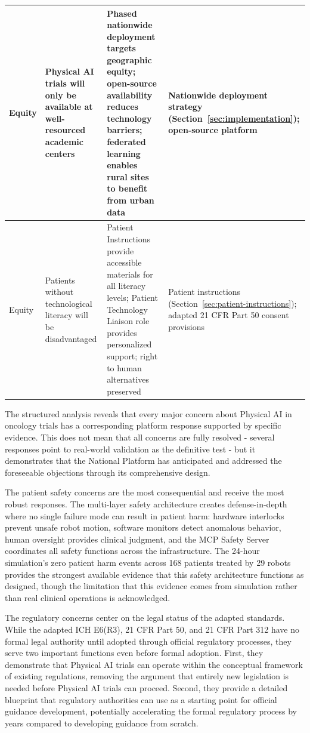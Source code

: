\begin{longtable}{p{2.2cm} p{3.5cm} p{3.0cm} p{3.0cm}}
Equity & Physical AI trials will only be available at well-resourced academic centers & Phased nationwide deployment targets geographic equity; open-source availability reduces technology barriers; federated learning enables rural sites to benefit from urban data & Nationwide deployment strategy (Section~\ref{sec:implementation}); open-source platform \cite{main-repo, mcp-repo, fl-repo} \\
\midrule
Equity & Patients without technological literacy will be disadvantaged & Patient Instructions \cite{patient-instructions-paper} provide accessible materials for all literacy levels; Patient Technology Liaison role provides personalized support; right to human alternatives preserved & Patient instructions (Section~\ref{sec:patient-instructions}); adapted 21 CFR Part 50 \cite{cfr50-adapt} consent provisions \\
\end{longtable}

The structured analysis reveals that every major concern about Physical AI in
oncology trials has a corresponding platform response supported by specific
evidence. This does not mean that all concerns are fully resolved - several
responses point to real-world validation as the definitive test - but it
demonstrates that the National Platform has anticipated and addressed the
foreseeable objections through its comprehensive design.

The patient safety concerns are the most consequential and receive the most
robust responses. The multi-layer safety architecture creates defense-in-depth
where no single failure mode can result in patient harm: hardware interlocks
prevent unsafe robot motion, software monitors detect anomalous behavior,
human oversight provides clinical judgment, and the MCP Safety Server
coordinates all safety functions across the infrastructure. The 24-hour
simulation's zero patient harm events across 168 patients treated by 29 robots
provides the strongest available evidence that this safety architecture
functions as designed, though the limitation that this evidence comes from
simulation rather than real clinical operations is acknowledged.

The regulatory concerns center on the legal status of the adapted standards.
While the adapted ICH E6(R3), 21 CFR Part 50, and 21 CFR Part 312 have no
formal legal authority until adopted through official regulatory processes,
they serve two important functions even before formal adoption. First, they
demonstrate that Physical AI trials can operate within the conceptual framework
of existing regulations, removing the argument that entirely new legislation
is needed before Physical AI trials can proceed. Second, they provide a
detailed blueprint that regulatory authorities can use as a starting point
for official guidance development, potentially accelerating the formal
regulatory process by years compared to developing guidance from scratch.

